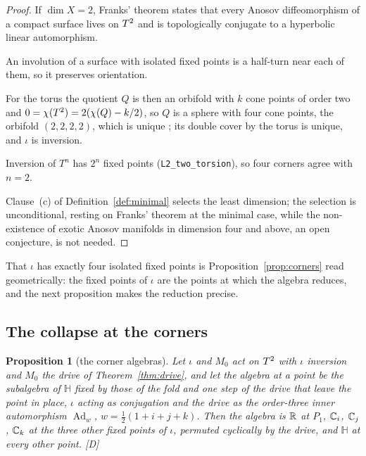 \documentclass[11pt,a4paper]{article}
\theoremstyle{plain}
\newtheorem{proposition}[theorem]{Proposition}
\theoremstyle{definition}
\theoremstyle{remark}
\newcommand{\Hquat}{\mathbb{H}}
\newcommand{\Ad}{\operatorname{Ad}}
\newcommand{\rigD}{[\textup{D}]}
\begin{document}
\begin{proof}
If $\dim X=2$, Franks' theorem \cite{Franks1970} states that every Anosov diffeomorphism of a compact surface lives on $T^2$ and is topologically conjugate to a hyperbolic linear automorphism.

An involution of a surface with isolated fixed points is a half-turn near each of them, so it preserves orientation.

For the torus the quotient $Q$ is then an orbifold with $k$ cone points of order two and $0=\chi(T^2)=2(\chi(Q)-k/2)$, so $Q$ is a sphere with four cone points, the orbifold $(2,2,2,2)$, which is unique \cite{Thurston}; its double cover by the torus is unique, and $\iota$ is inversion.

Inversion of $T^{n}$ has $2^{n}$ fixed points (\texttt{L2\_two\_torsion}), so four corners agree with $n=2$.

Clause~(c) of Definition~\ref{def:minimal} selects the least dimension; the selection is unconditional, resting on Franks' theorem at the minimal case, while the non-existence of exotic Anosov manifolds in dimension four and above, an open conjecture, is not needed.
\end{proof}

That $\iota$ has exactly four isolated fixed points is Proposition~\ref{prop:corners} read geometrically: the fixed points of $\iota$ are the points at which the algebra reduces, and the next proposition makes the reduction precise.

\subsection{The collapse at the corners}

\begin{proposition}[the corner algebras]\label{prop:collapse}
Let $\iota$ and $M_{0}$ act on $T^2$ with $\iota$ inversion and $M_{0}$ the drive of Theorem~\ref{thm:drive}, and let the algebra at a point be the subalgebra of $\Hquat$ fixed by those of the fold and one step of the drive that leave the point in place, $\iota$ acting as conjugation and the drive as the order-three inner automorphism $\Ad_{w}$, $w=\tfrac12(1+i+j+k)$. Then the algebra is $\mathbb{R}$ at $P_{1}$, $\mathbb{C}_{i}$, $\mathbb{C}_{j}$, $\mathbb{C}_{k}$ at the three other fixed points of $\iota$, permuted cyclically by the drive, and $\Hquat$ at every other point. \rigD
\end{proposition}
\end{document}
